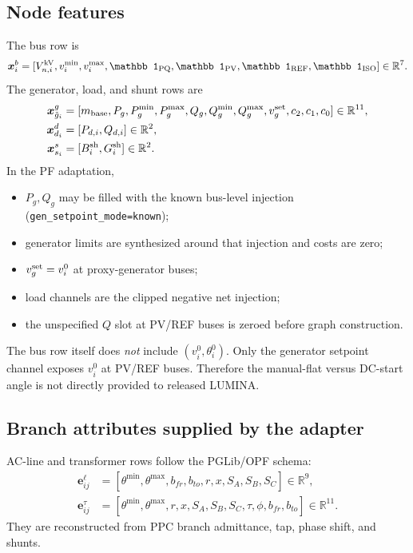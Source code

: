 \documentclass[10pt]{article}
\newcommand{\R}{\mathbb{R}}
\newcommand{\code}[1]{\texttt{#1}}
\begin{document}
\subsection{Node features}

The bus row is
\begin{equation}
 \bm x_i^b=[V_{n,i}^{\rm kV},v_i^{\min},v_i^{\max},
 \mathbb 1_{\rm PQ},\mathbb 1_{\rm PV},\mathbb 1_{\rm REF},
 \mathbb 1_{\rm ISO}]\in\R^7.
\end{equation}
The generator, load, and shunt rows are
\begin{align}
 \bm x_{\tilde g_i}^g&=[m_{\rm base},P_g,P_g^{\min},P_g^{\max},Q_g,
 Q_g^{\min},Q_g^{\max},v_g^{\rm set},c_2,c_1,c_0]\in\R^{11},\\
 \bm x_{d_i}^d&=[P_{d,i},Q_{d,i}]\in\R^2,\\
 \bm x_{s_i}^s&=[B_i^{\rm sh},G_i^{\rm sh}]\in\R^2.
\end{align}
In the PF adaptation,
\begin{itemize}
 \item \(P_g,Q_g\) may be filled with the known bus-level injection
       (\code{gen\_setpoint\_mode=known});
 \item generator limits are synthesized around that injection and costs are zero;
 \item \(v_g^{\rm set}=v_i^0\) at proxy-generator buses;
 \item load channels are the clipped negative net injection;
 \item the unspecified \(Q\) slot at PV/REF buses is zeroed before graph construction.
\end{itemize}

The bus row itself does \emph{not} include \((v_i^0,\theta_i^0)\). Only the
generator setpoint channel exposes \(v_i^0\) at PV/REF buses. Therefore the
manual-flat versus DC-start angle is not directly provided to released LUMINA.

\subsection{Branch attributes supplied by the adapter}

AC-line and transformer rows follow the PGLib/OPF schema:
\begin{align}
 \bm e_{ij}^{\ell}&=[\theta^{\min},\theta^{\max},b_{fr},b_{to},r,x,
 S_A,S_B,S_C]\in\R^9,\\
 \bm e_{ij}^{\tau}&=[\theta^{\min},\theta^{\max},r,x,S_A,S_B,S_C,
 \tau,\phi,b_{fr},b_{to}]\in\R^{11}.
\end{align}
They are reconstructed from PPC branch admittance, tap, phase shift, and shunts.
\end{document}
